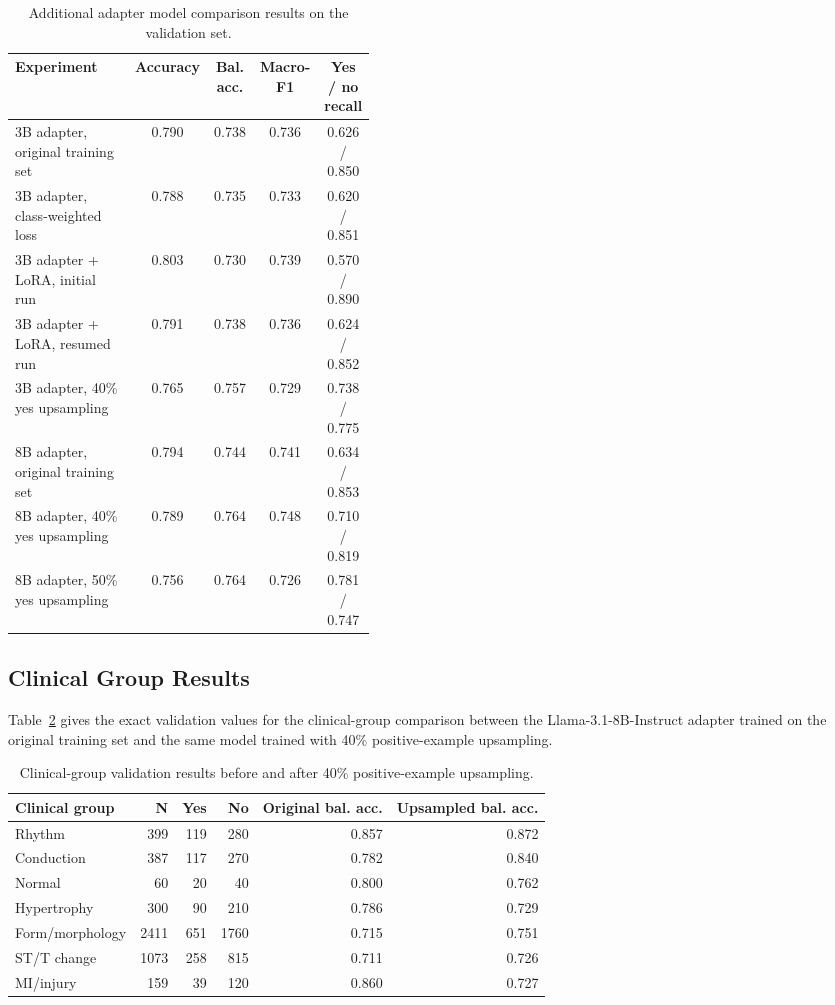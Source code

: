 \begin{table}[H]
\centering
\caption{Additional adapter model comparison results on the validation set.}
\label{tab:appendix_model_comparison}
\small
\begin{tabular}{p{0.42\linewidth}cccc}
\hline
\textbf{Experiment} & \textbf{Accuracy} & \textbf{Bal. acc.} & \textbf{Macro-F1} & \textbf{Yes / no recall} \\
\hline
3B adapter, original training set & 0.790 & 0.738 & 0.736 & 0.626 / 0.850 \\
3B adapter, class-weighted loss & 0.788 & 0.735 & 0.733 & 0.620 / 0.851 \\
3B adapter + LoRA, initial run & 0.803 & 0.730 & 0.739 & 0.570 / 0.890 \\
3B adapter + LoRA, resumed run & 0.791 & 0.738 & 0.736 & 0.624 / 0.852 \\
3B adapter, 40\% yes upsampling & 0.765 & 0.757 & 0.729 & 0.738 / 0.775 \\
8B adapter, original training set & 0.794 & 0.744 & 0.741 & 0.634 / 0.853 \\
8B adapter, 40\% yes upsampling & 0.789 & 0.764 & 0.748 & 0.710 / 0.819 \\
8B adapter, 50\% yes upsampling & 0.756 & 0.764 & 0.726 & 0.781 / 0.747 \\
\hline
\end{tabular}
\end{table}
\normalsize

\subsection{Clinical Group Results}
\label{app:clinical_group_results}

Table~\ref{tab:appendix_clinical_group_results} gives the exact validation values for the clinical-group comparison between the Llama-3.1-8B-Instruct adapter trained on the original training set and the same model trained with 40\% positive-example upsampling.

\begin{table}[H]
\centering
\caption{Clinical-group validation results before and after 40\% positive-example upsampling.}
\label{tab:appendix_clinical_group_results}
\small
\begin{tabular}{lrrrrr}
\hline
\textbf{Clinical group} & \textbf{N} & \textbf{Yes} & \textbf{No} & \textbf{Original bal. acc.} & \textbf{Upsampled bal. acc.} \\
\hline
Rhythm & 399 & 119 & 280 & 0.857 & 0.872 \\
Conduction & 387 & 117 & 270 & 0.782 & 0.840 \\
Normal & 60 & 20 & 40 & 0.800 & 0.762 \\
Hypertrophy & 300 & 90 & 210 & 0.786 & 0.729 \\
Form/morphology & 2411 & 651 & 1760 & 0.715 & 0.751 \\
ST/T change & 1073 & 258 & 815 & 0.711 & 0.726 \\
MI/injury & 159 & 39 & 120 & 0.860 & 0.727 \\
\hline
\end{tabular}
\end{table}
\normalsize

